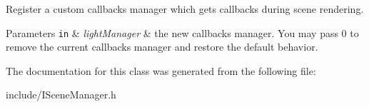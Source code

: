 Register a custom callbacks manager which gets callbacks during scene rendering. 


\begin{DoxyParams}[1]{Parameters}
\mbox{\tt in}  & {\em light\+Manager} & the new callbacks manager. You may pass 0 to remove the current callbacks manager and restore the default behavior. \\
\hline
\end{DoxyParams}


The documentation for this class was generated from the following file\+:\begin{DoxyCompactItemize}
\item 
include/I\+Scene\+Manager.\+h\end{DoxyCompactItemize}
